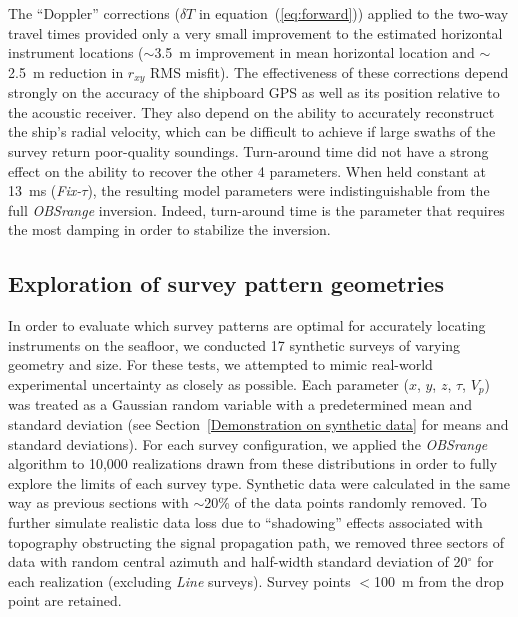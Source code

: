 The ``Doppler'' corrections ($\delta T$ in equation~(\ref{eq:forward})) applied to the two-way travel times provided only a very small improvement to the estimated horizontal instrument locations ($\sim$3.5~m improvement in mean horizontal location and $\sim$2.5~m reduction in $r_{xy}$ RMS misfit). The effectiveness of these corrections depend strongly on the accuracy of the shipboard GPS as well as its position relative to the acoustic receiver. They also depend on the ability to accurately reconstruct the ship's radial velocity, which can be difficult to achieve if large swaths of the survey return poor-quality soundings. Turn-around time did not have a strong effect on the ability to recover the other 4 parameters. When held constant at 13~ms (\textit{Fix-$\tau$}), the resulting model parameters were indistinguishable from the full \textit{OBSrange} inversion. Indeed, turn-around time is the parameter that requires the most damping in order to stabilize the inversion.


\subsection{Exploration of survey pattern geometries} \label{sec:surv_geom_tests}

In order to evaluate which survey patterns are optimal for accurately locating instruments on the seafloor, we conducted 17 synthetic surveys of varying geometry and size. For these tests, we attempted to mimic real-world experimental uncertainty as closely as possible. Each parameter ($x$, $y$, $z$, $\tau$, $V_p$) was treated as a Gaussian random variable with a predetermined mean and standard deviation (see Section~\ref{Demonstration on synthetic data} for means and standard deviations). For each survey configuration, we applied the \textit{OBSrange} algorithm to 10,000 realizations drawn from these distributions in order to fully explore the limits of each survey type. Synthetic data were calculated in the same way as previous sections with $\sim$20\% of the data points randomly removed. To further simulate realistic data loss due to ``shadowing'' effects associated with topography obstructing the signal propagation path, we removed three sectors of data with random central azimuth and half-width standard deviation of 20$^{\circ}$ for each realization (excluding \textit{Line} surveys). Survey points $<$100~m from the drop point are retained.

